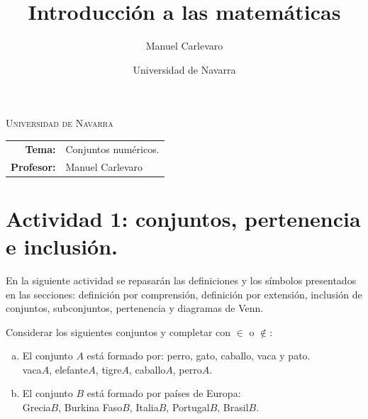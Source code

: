 \documentclass[11pt]{article}
\title{Introducción a las matemáticas}
\author{Manuel Carlevaro}
\date{Universidad de Navarra}
\begin{document}

\begin{center}
\end{center} 

\begin{center}
\vspace{1em}
\Large{\textsc{Universidad de Navarra}} 
\end{center}

 \vspace{1em}

\begin{center}
\begin{tabular}{r l}
 \textbf{Tema:} & Conjuntos numéricos. \\
 \textbf{Profesor:} & Manuel Carlevaro \\
\end{tabular}\end{center}

\vspace{2em}
\section*{Actividad 1: conjuntos, pertenencia e inclusión.}

En la siguiente actividad se repasarán las definiciones y los símbolos presentados en las secciones: definición por comprensión, definición por extensión, inclusión de conjuntos, subconjuntos, pertenencia y diagramas de Venn.

\begin{exercise}
Considerar los siguientes conjuntos y completar con $\in$ o $\notin$:
\begin{enumerate}[a)]
    \item El conjunto $A$ está formado por: perro, gato, caballo, vaca y pato. \\[1.0em]
        vaca$A$, elefante\blank{}$A$, tigre\blank{}$A$, caballo\blank{}$A$, perro\blank{}$A$.
    \item El conjunto $B$ está formado por países de Europa: \\[1.0em]
        Grecia\blank{}$B$, Burkina Faso\blank{}$B$, Italia\blank{}$B$, Portugal\blank{}$B$, Brasil\blank{}$B$. 
\end{enumerate}
\end{exercise}
\end{document}
